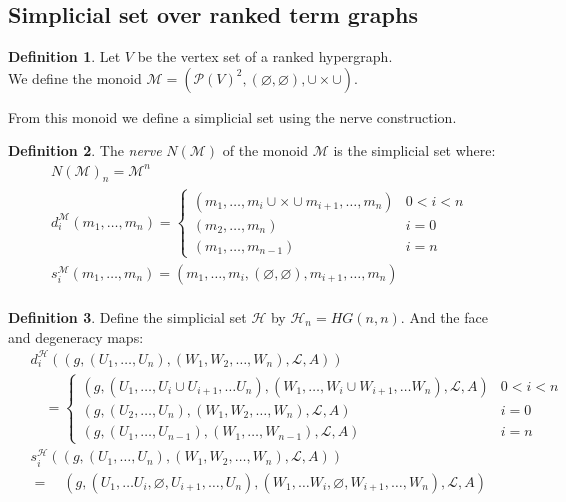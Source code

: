 \documentclass[12pt]{article}
\theoremstyle{definition}
\newtheorem{definition}{Definition}[section]
\renewcommand{\P}{\mathcal{P}}
\newcommand{\1}{\mathbbm{1}}
\renewcommand{\L}{\mathcal{L}}
\newcommand{\M}{\mathcal{M}}
\renewcommand{\H}{\mathcal{H}}
\begin{document}
\subsection{Simplicial set over ranked term graphs}
\begin{definition}
    Let $V$ be the vertex set of a ranked hypergraph.\\
    We define the monoid $\M = (\P(V)^2, (\varnothing, \varnothing), \cup\times\cup)$. 
\end{definition}

From this monoid we define a simplicial set using the nerve construction.

\begin{definition}
    The \emph{nerve} $N(\M)$ of the monoid $\M$ is the simplicial set where:
    \begin{align*}
        N(\M)_n = \M^n\\
        d^{\M}_i(m_1,\dots,m_n) = 
        \begin{cases}
            (m_1,\dots,m_i \cup\times\cup m_{i+1}, \dots, m_n) & 0 < i < n\\
            (m_2,\dots, m_n) & i = 0\\
            (m_1,\dots,m_{n-1}) & i = n
        \end{cases}\\
        s^{\M}_i(m_1,\dots,m_n) = (m_1, \dots, m_i, (\varnothing, \varnothing), m_{i+1}, \dots, m_n)\\
    \end{align*}
\end{definition}

\begin{definition}
Define the simplicial set $\H$ by $\H_n = HG(n,n)$. And the face and degeneracy maps:
\begin{align*}
    &d_i^{\H} ((g, (U_1, \dots, U_n), (W_1, W_2, \dots, W_n), \L, A))\\
    &\quad=\begin{cases}
        (g, (U_1, \dots, U_i\cup U_{i+1}, \dots U_n), (W_1, \dots, W_i\cup W_{i+1}, \dots W_n), \L, A) & 0 < i < n\\
        (g, (U_2, \dots, U_n), (W_1, W_2, \dots, W_n), \L, A) & i = 0\\
        (g, (U_1, \dots, U_{n-1}), (W_1, \dots, W_{n-1}), \L, A) & i = n
    \end{cases}\\
    \hspace{5pt}
    &s_i^{\H}((g, (U_1, \dots, U_n), (W_1, W_2, \dots, W_n), \L, A))\\
    &=\quad (g, (U_1, \dots U_i, \varnothing, U_{i+1}, \dots, U_n), (W_1, \dots W_i, \varnothing, W_{i+1}, \dots, W_n), \L, A)
\end{align*}
\end{definition}
\end{document}
